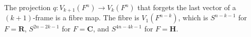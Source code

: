 The projection $q: V_{k+1}(F^n) \to V_k(F^n)$ that forgets the last vector of a $(k+1)$-frame is a fibre map. The fibre is $V_1(F^{n-k})$, which is $S^{n-k-1}$ for $F = \mathbf{R}$, $S^{2n-2k-1}$ for $F = \mathbf{C}$, and $S^{4n-4k-1}$ for $F = \mathbf{H}$.
